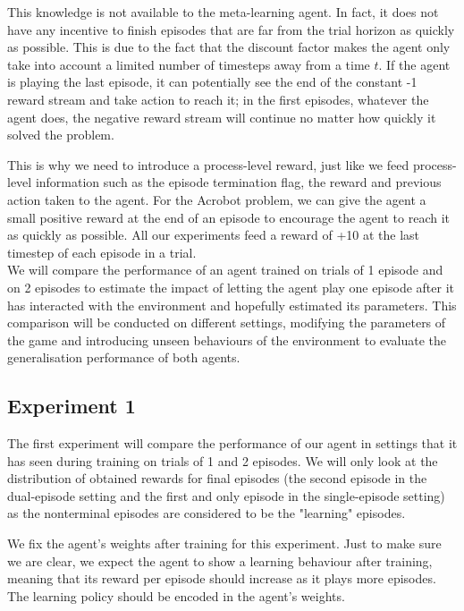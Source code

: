 \documentclass[letterpaper]{article}
\begin{document}
This knowledge is not available to the meta-learning agent. In fact, it does
not have any incentive to finish episodes that are far from the trial horizon
as quickly as possible. This is due to the fact that the discount factor makes
the agent only take into account a limited number of timesteps away from a time
$t$. If the agent is playing the last episode, it can potentially see the
end of the constant -1 reward stream and take action to reach it; in the first
episodes, whatever the agent does, the negative reward stream will continue no 
matter how quickly it solved the problem. 

This is why we need to introduce a process-level reward, just like we feed
process-level information such as the episode termination flag, the reward
and previous action taken to the agent. For the Acrobot problem, we can
give the agent a small positive reward at the end of an episode to encourage
the agent to reach it as quickly as possible. All our experiments feed a
reward of +10 at the last timestep of each episode in a trial.\\

We will compare the performance of an agent trained on trials of 1 episode
and on 2 episodes to estimate the impact of letting the agent play one episode
after it has interacted with the environment and hopefully estimated
its parameters. This comparison will be conducted on different settings,
modifying the parameters of the game and introducing unseen behaviours of
the environment to evaluate the generalisation performance of both agents.

\subsection{Experiment 1}
The first experiment will compare the performance of our agent in settings
that it has seen during training on trials of 1 and 2 episodes. We will only
look at the distribution of obtained rewards for final episodes (the second 
episode in the dual-episode setting and the first and only episode in the
single-episode setting) as the nonterminal episodes are considered to be the 
"learning" episodes.

We fix the agent's weights after training for this experiment. Just to make sure
we are clear, we expect the agent to show a learning behaviour after training,
meaning that its reward per episode should increase as it plays more episodes.
The learning policy should be encoded in the agent's weights.
\end{document}
